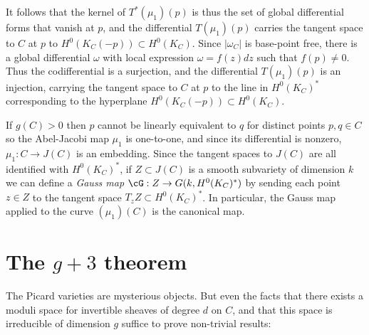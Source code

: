 It follows that
the kernel of $T^*(\mu_1)(p)$ is thus the set of global differential forms that vanish at $p$,
and the differential $T(\mu_1)(p)$ carries the tangent space to $C$ at $p$ to $H^0(K_C(-p)) \subset H^0(K_C)$. Since $|\omega_C|$ is  base-point free, there is a global differential $\omega$ 
with local expression $\omega = f(z)dz$ such that $f(p) \neq 0$. Thus the codifferential is a surjection, and  the
differential $T(\mu_1)(p)$ is an injection, carrying the tangent space to $C$ at $p$ to the line
in $H^0(K_C)^*$ corresponding to the hyperplane $H^0(K_C(-p))\subset H^0(K_C)$.

If $g(C)>0$ then $p$ cannot be linearly equivalent to $q$ for distinct points $p, q \in C$ so the Abel-Jacobi map $\mu_1$ is one-to-one, and since its differential is nonzero, $\mu_1 : C \to J(C)$ is an embedding. Since the tangent spaces to $J(C)$ are all identified with $H^0(K_C)^*$, if $Z \subset J(C)$ is a smooth subvariety of dimension $k$ we can define a \emph{Gauss map} $\cG : Z \to G(k, H^0(K_C)^*)$ by sending each point $z \in Z$ to the tangent space $T_zZ\subset H^0(K_C)^*$.
In particular, the Gauss map applied to the curve $(\mu_1)(C)$ is the canonical map.


\section{The $g+3$ theorem}\label{g+3 section}


The Picard varieties are mysterious objects.  But even the facts that there exists a  moduli space for invertible sheaves of degree $d$ on $C$, and that this space is irreducible of dimension $g$ suffice to prove non-trivial results: 

